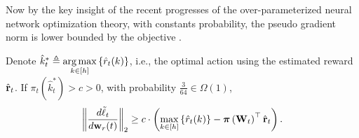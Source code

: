 Now by the key insight of the recent progresses of the over-parameterized neural network optimization theory, with constants probability, the pseudo gradient norm is lower bounded by the objective \citep{li2018learning}.

\begin{lem}
\label{lem:gradient_lower_bound}
	Denote $\hat{k}_t^* \triangleq \operatorname*{arg\,max}\limits_{k \in [h]}\left\{ \hat{r}_{t}(k) \right\}$, i.e., the optimal action using the estimated reward $ \hat{{\mathbf{r}}}_t$. If $\pi_{t}(\hat{k}_t^*) > c > 0$, with probability $\frac{3}{64} \in \Omega\left( 1 \right)$,
\begin{equation*}
\begin{split}
	\left\| \frac{d\tilde{\ell}_t}{d {\mathbf{w}}_r(t)} \right\|_2 \ge c \cdot \left( \max\limits_{k \in \left[h\right]}\left\{ \hat{r}_{t}(k) \right\} - {\boldsymbol{\pi}}\left( {\mathbf{W}}_t \right)^\top \hat{{\mathbf{r}}}_t \right) .
\end{split}
\end{equation*}
\end{lem}


